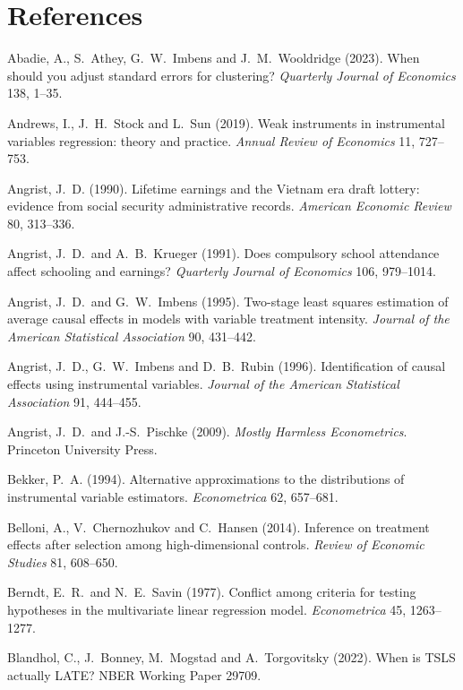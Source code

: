\documentclass[11pt,a4paper]{article}
\begin{document}
\section*{References}
{\small
{}
\begin{description}[leftmargin=1.4em,labelindent=0pt,itemsep=2pt,font=\normalfont]
\item Abadie, A., S.~Athey, G.~W.~Imbens and J.~M.~Wooldridge (2023). When should you adjust standard errors for clustering? \emph{Quarterly Journal of Economics} 138, 1--35.
\item Andrews, I., J.~H.~Stock and L.~Sun (2019). Weak instruments in instrumental variables regression: theory and practice. \emph{Annual Review of Economics} 11, 727--753.
\item Angrist, J.~D. (1990). Lifetime earnings and the Vietnam era draft lottery: evidence from social security administrative records. \emph{American Economic Review} 80, 313--336.
\item Angrist, J.~D.\ and A.~B.~Krueger (1991). Does compulsory school attendance affect schooling and earnings? \emph{Quarterly Journal of Economics} 106, 979--1014.
\item Angrist, J.~D.\ and G.~W.~Imbens (1995). Two-stage least squares estimation of average causal effects in models with variable treatment intensity. \emph{Journal of the American Statistical Association} 90, 431--442.
\item Angrist, J.~D., G.~W.~Imbens and D.~B.~Rubin (1996). Identification of causal effects using instrumental variables. \emph{Journal of the American Statistical Association} 91, 444--455.
\item Angrist, J.~D.\ and J.-S.~Pischke (2009). \emph{Mostly Harmless Econometrics}. Princeton University Press.
\item Bekker, P.~A. (1994). Alternative approximations to the distributions of instrumental variable estimators. \emph{Econometrica} 62, 657--681.
\item Belloni, A., V.~Chernozhukov and C.~Hansen (2014). Inference on treatment effects after selection among high-dimensional controls. \emph{Review of Economic Studies} 81, 608--650.
\item Berndt, E.~R.\ and N.~E.~Savin (1977). Conflict among criteria for testing hypotheses in the multivariate linear regression model. \emph{Econometrica} 45, 1263--1277.
\item Blandhol, C., J.~Bonney, M.~Mogstad and A.~Torgovitsky (2022). When is TSLS actually LATE? NBER Working Paper 29709.

\end{description}}
\end{document}
